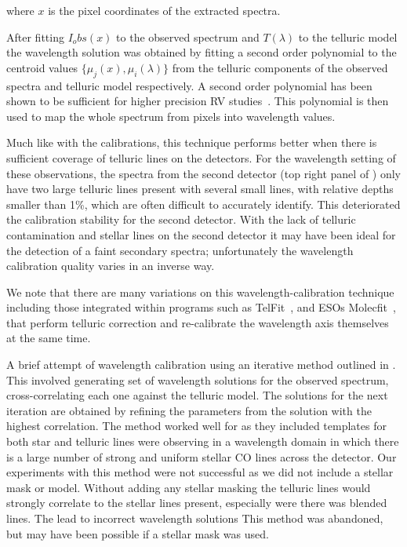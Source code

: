 where \(x \) is the pixel coordinates of the extracted spectra.


After fitting \(I_obs(x)\) to the observed spectrum and \(T(\lambda)\) to the telluric model the wavelength solution was obtained by fitting a second order polynomial to the centroid values \(\{\mu_{j}(x), \mu_{i}(\lambda)\} \) from the telluric components of the observed spectra and telluric model respectively. A second order polynomial has been shown to be sufficient for higher precision RV studies~\citep[e.g.][]{bean_groundbased_2010, figueira_radial_2010}. This polynomial is then used to map the whole spectrum from pixels into wavelength values.


Much like with the {\thar} calibrations, this technique performs better when there is sufficient coverage of telluric lines on the detectors. For the wavelength setting of these observations, the spectra from the second detector (top right panel of ) only have two large telluric lines present with several small lines, with relative depths smaller than 1\%, which are often difficult to accurately identify. This deteriorated the calibration stability for the second detector. With the lack of telluric contamination and stellar lines on the second detector it may have been ideal for the detection of a faint secondary spectra; unfortunately the wavelength calibration quality varies in an inverse way.


We note that there are many variations on this wavelength-calibration technique including those integrated within programs such as TelFit~\citet{gullikson_correcting_2014}, and ESOs Molecfit~\citet{smette_molecfit_2015}, that perform telluric correction and re-calibrate the wavelength axis themselves at the same time.


A brief attempt of wavelength calibration using an iterative method outlined in \cite{brogi_rotation_2016}. This involved generating set of wavelength solutions for the observed spectrum, cross-correlating each one against the telluric model. The solutions for the next iteration are obtained by refining the parameters from the solution with the highest correlation. 
The method worked well for \citet{brogi_rotation_2016} as they included templates for both star and telluric lines were observing in a wavelength domain in which there is a large number of strong and uniform stellar CO lines across the detector. 
Our experiments with this method were not successful as we did not include a stellar mask or model. Without adding any stellar masking the telluric lines would strongly correlate to the stellar lines present, especially were there was blended lines. The lead to incorrect wavelength solutions This method was abandoned, but may have been possible if a stellar mask was used.

